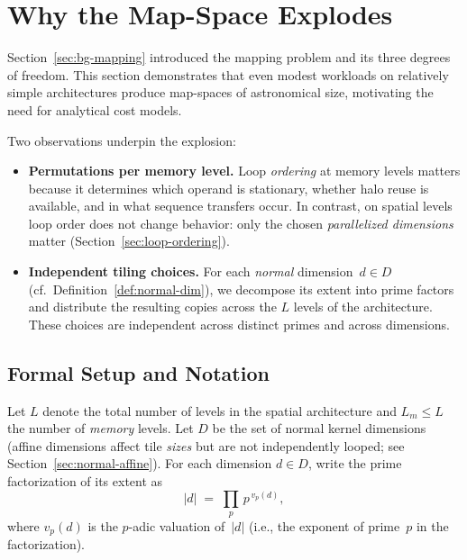 \section{Why the Map-Space Explodes}
\label{sec:bg-mapspace}

Section~\ref{sec:bg-mapping} introduced the mapping problem and its
three degrees of freedom.
This section demonstrates that even modest workloads on relatively
simple architectures produce map-spaces of astronomical size, motivating
the need for analytical cost models.

Two observations underpin the explosion:

\begin{itemize}
  \item \textbf{Permutations per memory level.}
    Loop \emph{ordering} at memory levels matters because it determines
    which operand is stationary, whether halo reuse is available, and in
    what sequence transfers occur.
    In contrast, on spatial levels loop order does not change behavior:
    only the chosen \emph{parallelized dimensions} matter
    (Section~\ref{sec:loop-ordering}).

  \item \textbf{Independent tiling choices.}
    For each \emph{normal} dimension~$d \in D$
    (cf.\ Definition~\ref{def:normal-dim}), we decompose its extent
    into prime factors and distribute the resulting copies across the
    $L$ levels of the architecture.
    These choices are independent across distinct primes and across
    dimensions.
\end{itemize}


\subsection{Formal Setup and Notation}
\label{sec:mapspace-notation}

Let $L$ denote the total number of levels in the spatial architecture
and $L_m \le L$ the number of \emph{memory} levels.
Let $D$ be the set of normal kernel dimensions (affine dimensions
affect tile \emph{sizes} but are not independently looped; see
Section~\ref{sec:normal-affine}).
For each dimension $d \in D$, write the prime factorization of its
extent as
\[
  |d| \;=\; \prod_{p}\, p^{\,v_p(d)},
\]
where $v_p(d)$ is the $p$-adic valuation of~$|d|$ (i.e., the
exponent of prime~$p$ in the factorization).

